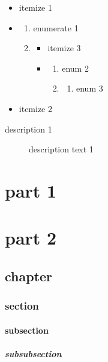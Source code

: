 \documentclass{article}
\begin{document}
    \begin{itemize}
        \item[!] itemize 1
        \item \begin{enumerate}
                  \item enumerate 1
                  \item \begin{itemize}
                            \item itemize 3
                            \item \begin{enumerate}
                                      \item enum 2
                                      \item \begin{enumerate}
                                                \item enum 3
                                      \end{enumerate}
                            \end{enumerate}
                  \end{itemize}
        \end{enumerate}
        \item itemize 2
    \end{itemize}
    \begin{description}
        \item[description 1] description text 1
    \end{description}


    \part{part 1}
    \part{part 2}
    \chapter{chapter}
    \section{section}
    \subsection{subsection}
    \subsubsection{subsubsection}
\end{document}

